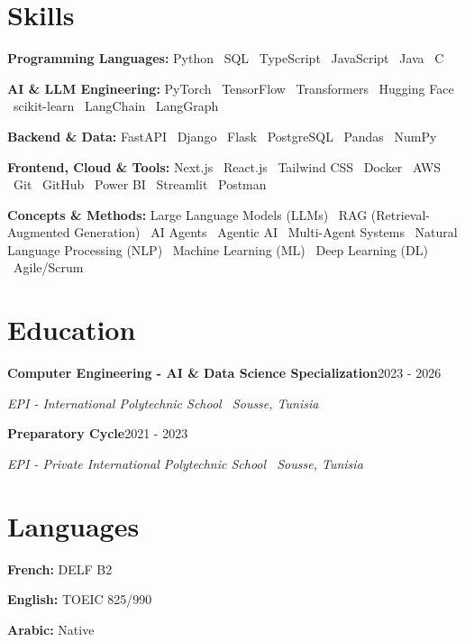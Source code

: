 \documentclass[11pt,a4paper]{article}
\newcommand{\entry}[2]{\textbf{#1}\hfill{\small\color{muted}#2}\par}
\newcommand{\org}[1]{{\itshape\color{muted}#1}\par}
\begin{document}
\section{Skills}
\textbf{\color{accent}Programming Languages:} Python \textperiodcentered\ SQL \textperiodcentered\ TypeScript \textperiodcentered\ JavaScript \textperiodcentered\ Java \textperiodcentered\ C\par
\smallskip
\textbf{\color{accent}AI \& LLM Engineering:} PyTorch \textperiodcentered\ TensorFlow \textperiodcentered\ Transformers \textperiodcentered\ Hugging Face \textperiodcentered\ scikit-learn \textperiodcentered\ LangChain \textperiodcentered\ LangGraph\par
\smallskip
\textbf{\color{accent}Backend \& Data:} FastAPI \textperiodcentered\ Django \textperiodcentered\ Flask \textperiodcentered\ PostgreSQL \textperiodcentered\ Pandas \textperiodcentered\ NumPy\par
\smallskip
\textbf{\color{accent}Frontend, Cloud \& Tools:} Next.js \textperiodcentered\ React.js \textperiodcentered\ Tailwind CSS \textperiodcentered\ Docker \textperiodcentered\ AWS \textperiodcentered\ Git \textperiodcentered\ GitHub \textperiodcentered\ Power BI \textperiodcentered\ Streamlit \textperiodcentered\ Postman\par
\smallskip
\textbf{\color{accent}Concepts \& Methods:} Large Language Models (LLMs) \textperiodcentered\ RAG (Retrieval-Augmented Generation) \textperiodcentered\ AI Agents \textperiodcentered\ Agentic AI \textperiodcentered\ Multi-Agent Systems \textperiodcentered\ Natural Language Processing (NLP) \textperiodcentered\ Machine Learning (ML) \textperiodcentered\ Deep Learning (DL) \textperiodcentered\ Agile/Scrum\par

\noindent
\begin{minipage}[t]{0.72\textwidth}
  \section{Education}
  \entry{Computer Engineering - AI \& Data Science Specialization}{2023 - 2026}
  \org{EPI - International Polytechnic School \textperiodcentered\ Sousse, Tunisia}
  \vspace{3pt}

  \entry{Preparatory Cycle}{2021 - 2023}
  \org{EPI - Private International Polytechnic School \textperiodcentered\ Sousse, Tunisia}
\end{minipage}\hfill
\begin{minipage}[t]{0.25\textwidth}
  \section{Languages}
  \textbf{\color{accent}French:} DELF B2\par\vspace{3.5pt}
  \textbf{\color{accent}English:} TOEIC 825/990\par\vspace{3.5pt}
  \textbf{\color{accent}Arabic:} Native\par
\end{minipage}
\end{document}
